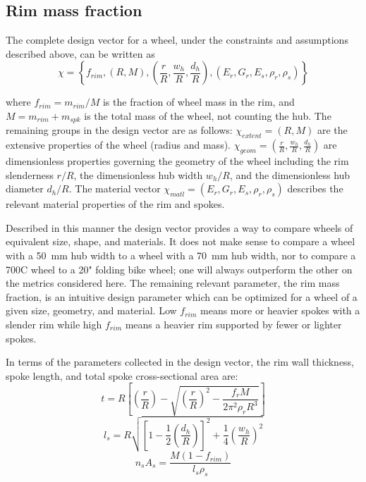 \documentclass[\rootdir/thesis.tex]{subfiles}
\begin{document}
\subsection{Rim mass fraction}

The complete design vector for a wheel, under the constraints and assumptions described above, can be written as
\begin{equation}
\label{eqn:design_vector}
\chi = \left\lbrace f_{rim}, (R, M), \left(\frac{r}{R}, \frac{w_h}{R}, \frac{d_h}{R}\right), (E_r, G_r, E_s, \rho_r, \rho_s) \right\rbrace
\end{equation}

where $f_{rim} = m_{rim}/M$ is the fraction of wheel mass in the rim, and $M=m_{rim} + m_{spk}$ is the total mass of the wheel, not counting the hub. The remaining groups in the design vector are as follows: $\chi_{extent}=(R, M)$ are the extensive properties of the wheel (radius and mass). $\chi_{geom} = \left(\frac{r}{R}, \frac{w_h}{R}, \frac{d_h}{R}\right)$ are dimensionless properties governing the geometry of the wheel including the rim slenderness $r/R$, the dimensionless hub width $w_h/R$, and the dimensionless hub diameter $d_h/R$. The material vector $\chi_{matl}= (E_r, G_r, E_s, \rho_r, \rho_s)$ describes the relevant material properties of the rim and spokes.

Described in this manner the design vector provides a way to compare wheels of equivalent size, shape, and materials. It does not make sense to compare a wheel with a \SI{50}{mm} hub width to a wheel with a \SI{70}{mm} hub width, nor to compare a 700C wheel to a 20" folding bike wheel; one will always outperform the other on the metrics considered here. The remaining relevant parameter, the rim mass fraction, is an intuitive design parameter which can be optimized for a wheel of a given size, geometry, and material. Low $f_{rim}$ means more or heavier spokes with a slender rim while high $f_{rim}$ means a heavier rim supported by fewer or lighter spokes.


In terms of the parameters collected in the design vector, the rim wall thickness, spoke length, and total spoke cross-sectional area are:
\begin{equation}
\label{eqn:design:t}
t = R\left[ \left(\frac{r}{R}\right) - \sqrt{\left(\frac{r}{R}\right)^2 - \frac{f_rM}{2\pi^2\rho_rR^3}}\right]
\end{equation}
\begin{equation}
\label{eqn:design:ls}
l_s = R\sqrt{\left[1-\frac{1}{2}\left(\frac{d_h}{R}\right)\right]^2 + \frac{1}{4}\left(\frac{w_h}{R}\right)^2}
\end{equation}
\begin{equation}
\label{eqn:design:nsAs}
n_sA_s = \frac{M(1-f_{rim})}{l_s\rho_s}
\end{equation}
\end{document}
